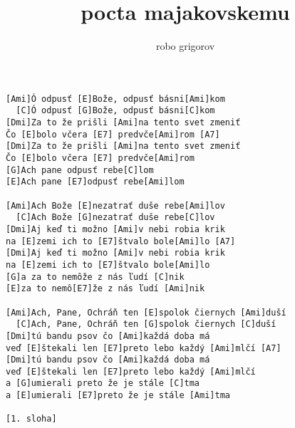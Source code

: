 \author{robo grigorov}
\title{pocta majakovskemu}
\maketitle
\begin{verbatim}
[Ami]Ó odpusť [E]Bože, odpusť básni[Ami]kom
  [C]Ó odpusť [G]Bože, odpusť básni[C]kom
[Dmi]Za to že prišli [Ami]na tento svet zmeniť
Čo [E]bolo včera [E7] predvče[Ami]rom [A7]
[Dmi]Za to že prišli [Ami]na tento svet zmeniť
Čo [E]bolo včera [E7] predvče[Ami]rom
[G]Ach pane odpusť rebe[C]lom
[E]Ach pane [E7]odpusť rebe[Ami]lom

[Ami]Ach Bože [E]nezatrať duše rebe[Ami]lov
  [C]Ach Bože [G]nezatrať duše rebe[C]lov
[Dmi]Aj keď ti možno [Ami]v nebi robia krik
na [E]zemi ich to [E7]štvalo bole[Ami]lo [A7]
[Dmi]Aj keď ti možno [Ami]v nebi robia krik
na [E]zemi ich to [E7]štvalo bole[Ami]lo
[G]a za to nemôže z nás ľudí [C]nik
[E]za to nemô[E7]že z nás ľudí [Ami]nik

[Ami]Ach, Pane, Ochráň ten [E]spolok čiernych [Ami]duší
  [C]Ach, Pane, Ochráň ten [G]spolok čiernych [C]duší
[Dmi]tú bandu psov čo [Ami]každá doba má
veď [E]štekali len [E7]preto lebo každý [Ami]mlčí [A7]
[Dmi]tú bandu psov čo [Ami]každá doba má
veď [E]štekali len [E7]preto lebo každý [Ami]mlčí
a [G]umierali preto že je stále [C]tma
a [E]umierali [E7]preto že je stále [Ami]tma

[1. sloha]
\end{verbatim}